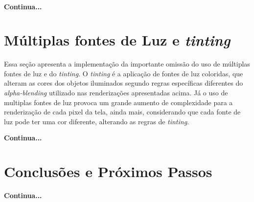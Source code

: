 \documentclass{article}
\begin{document}
	\paragraph{}
	\textbf{Continua...}
	
	\section{Múltiplas fontes de Luz e \textit{tinting}}
	
	\paragraph{}
	Essa seção apresenta a implementação da importante omissão do uso de múltiplas fontes de luz e do \textit{tinting}. O \textit{tinting} é a aplicação de fontes de luz coloridas, que alteram as cores dos objetos iluminados segundo regras específicas diferentes do \textit{alpha-blending} utilizado nas renderizações apresentadas acima. Já o uso de multiplas fontes de luz provoca um grande aumento de complexidade para a renderização de cada pixel da tela, ainda mais, considerando que cada fonte de luz pode ter uma cor diferente, alterando as regras de \textit{tinting}.
	
	\textbf{Continua...}
	
	\section{Conclusões e Próximos Passos}
	
	\paragraph{}
	\textbf{Continua...}

	
\end{document}
